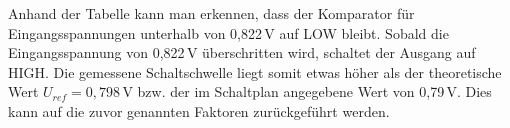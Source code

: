Anhand der Tabelle kann man erkennen, dass der Komparator für Eingangsspannungen unterhalb von 0{,}822\,V auf LOW bleibt. Sobald die Eingangsspannung von 0{,}822\,V überschritten wird, schaltet der Ausgang auf HIGH. Die gemessene Schaltschwelle liegt somit etwas höher als der theoretische Wert $U_{ref} = 0{,}798$\,V bzw. der im Schaltplan angegebene Wert von 0{,}79\,V. Dies kann auf die zuvor genannten Faktoren zurückgeführt werden.